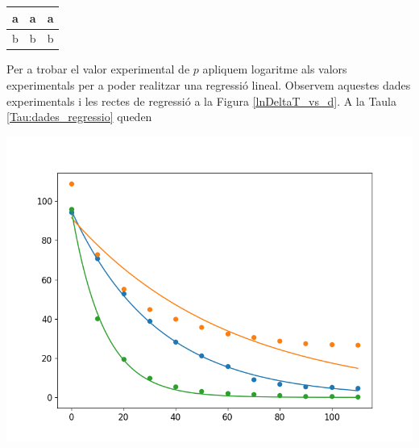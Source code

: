 \documentclass[12pt,twosides,onecolumn,openany]{article}
\newenvironment{Figura}
  {\par\medskip\noindent\minipage{\linewidth}}
  {\endminipage\par\medskip}
\begin{document}
\begin{multicols}{2}
\begin{Figura}
  \centering
  \begin{tabular}{c|c|c}
    a & a & a\\
    \hline
    b & b & b
  \end{tabular}
  \label{Tau:coef_exponencial}
\end{Figura}
Per a trobar el valor experimental de $p$ apliquem logaritme als valors experimentals per a poder realitzar una regressió lineal. Observem aquestes dades experimentals i les rectes de regressió a la Figura \ref{lnDeltaT_vs_d}. A la Taula \ref{Tau:dades_regressio} queden
\begin{Figura}
  \centering
  \includegraphics[width = 1\linewidth]{../../graphs/practica_Ia/plots/ln_theta.png}\label{lnDeltaT_vs_d}
\end{Figura}           


\end{multicols}
\end{document}
